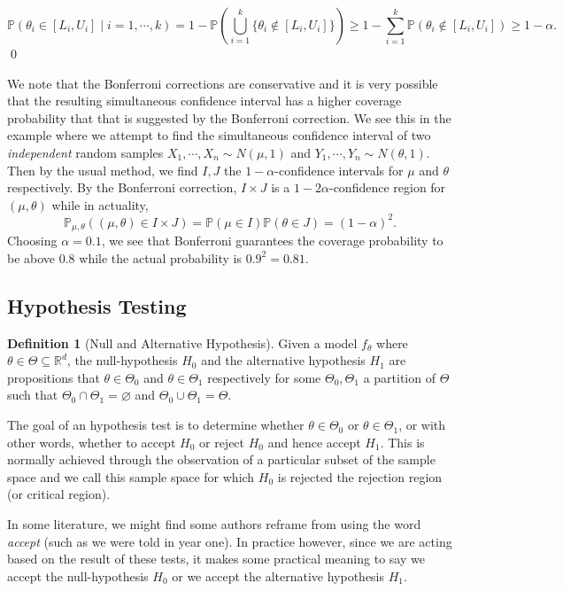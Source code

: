 \documentclass[
]{article}
\theoremstyle{definition}
\theoremstyle{definition}
\newtheorem{definition}{Definition}[section]
\begin{document}
\[\mathbb{P}(\theta_i \in [L_i, U_i] \mid i = 1, \cdots, k) = 1 - 
    \mathbb{P}\left(\bigcup_{i = 1}^k \{\theta_i \not\in [L_i, U_i]\}\right)
    \ge 1 - \sum_{i = 1}^k \mathbb{P}(\theta_i \not\in [L_i, U_i]) \ge 1 - \alpha.\]
\qed

We note that the Bonferroni corrections are conservative and it is very
possible that the resulting simultaneous confidence interval has a
higher coverage probability that that is suggested by the Bonferroni
correction. We see this in the example where we attempt to find the
simultaneous confidence interval of two \emph{independent} random
samples \(X_1, \cdots, X_n \sim N(\mu, 1)\) and
\(Y_1, \cdots, Y_n \sim N(\theta, 1)\). Then by the usual method, we
find \(I, J\) the \(1 - \alpha\)-confidence intervals for \(\mu\) and
\(\theta\) respectively. By the Bonferroni correction, \(I \times J\) is
a \(1 - 2\alpha\)-confidence region for \((\mu, \theta)\) while in
actuality, \[\mathbb{P}_{\mu, \theta}((\mu, \theta) \in I \times J) = 
  \mathbb{P}(\mu \in I) \mathbb{P}(\theta \in J) = (1 - \alpha)^2.\]
Choosing \(\alpha = 0.1\), we see that Bonferroni guarantees the
coverage probability to be above \(0.8\) while the actual probability is
\(0.9^2 = 0.81\).

\hypertarget{hypothesis-testing}{%
\subsection{Hypothesis Testing}\label{hypothesis-testing}}

\begin{definition}[Null and Alternative Hypothesis]
  Given a model \(f_\theta\) where \(\theta \in \Theta \subseteq \mathbb{R}^d\), 
  the null-hypothesis \(H_0\) and the alternative hypothesis \(H_1\) are propositions 
  that \(\theta \in \Theta_0\) and \(\theta \in \Theta_1\) respectively for 
  some \(\Theta_0, \Theta_1\) a partition of \(\Theta\) such that 
  \(\Theta_0 \cap \Theta_1 = \varnothing\) and \(\Theta_0 \cup \Theta_1 = \Theta\). 
\end{definition}

The goal of an hypothesis test is to determine whether
\(\theta \in \Theta_0\) or \(\theta \in \Theta_1\), or with other words,
whether to accept \(H_0\) or reject \(H_0\) and hence accept \(H_1\).
This is normally achieved through the observation of a particular subset
of the sample space and we call this sample space for which \(H_0\) is
rejected the rejection region (or critical region).

In some literature, we might find some authors reframe from using the
word \emph{accept} (such as we were told in year one). In practice
however, since we are acting based on the result of these tests, it
makes some practical meaning to say we accept the null-hypothesis
\(H_0\) or we accept the alternative hypothesis \(H_1\).
\end{document}

